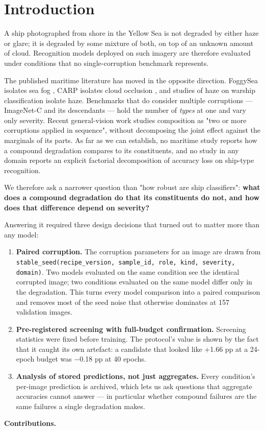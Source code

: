 \section{Introduction}
A ship photographed from shore in the Yellow Sea is not degraded by either haze or glare; it is degraded by some mixture of both, on top of an unknown amount of cloud. Recognition models deployed on such imagery are therefore evaluated under conditions that no single-corruption benchmark represents.

The published maritime literature has moved in the opposite direction. FoggySea isolates sea fog \cite{yang2026foggysea}, CARP isolates cloud occlusion \cite{zhan2025carp}, and studies of haze on warship classification isolate haze. Benchmarks that do consider multiple corruptions --- ImageNet-C \cite{hendrycks2019imagenetc} and its descendants --- hold the number of \emph{types} at one and vary only severity. Recent general-vision work studies composition as "two or more corruptions applied in sequence", without decomposing the joint effect against the marginals of its parts. As far as we can establish, no maritime study reports how a compound degradation compares to its constituents, and no study in any domain reports an explicit factorial decomposition of accuracy loss on ship-type recognition.

We therefore ask a narrower question than "how robust are ship classifiers": \textbf{what does a compound degradation do that its constituents do not, and how does that difference depend on severity?}

Answering it required three design decisions that turned out to matter more than any model:

\begin{enumerate}
\item \textbf{Paired corruption.} The corruption parameters for an image are drawn from \texttt{stable\_seed(recipe\_version, sample\_id, role, kind, severity, domain)}. Two models evaluated on the same condition see the identical corrupted image; two conditions evaluated on the same model differ only in the degradation. This turns every model comparison into a paired comparison and removes most of the seed noise that otherwise dominates at 157 validation images.
\item \textbf{Pre-registered screening with full-budget confirmation.} Screening statistics were fixed before training. The protocol's value is shown by the fact that it caught its own artefact: a candidate that looked like +1.66 pp at a 24-epoch budget was $-$0.18 pp at 40 epochs.
\item \textbf{Analysis of stored predictions, not just aggregates.} Every condition's per-image prediction is archived, which lets us ask questions that aggregate accuracies cannot answer --- in particular whether compound failures are the same failures a single degradation makes.
\end{enumerate}
\textbf{Contributions.}

